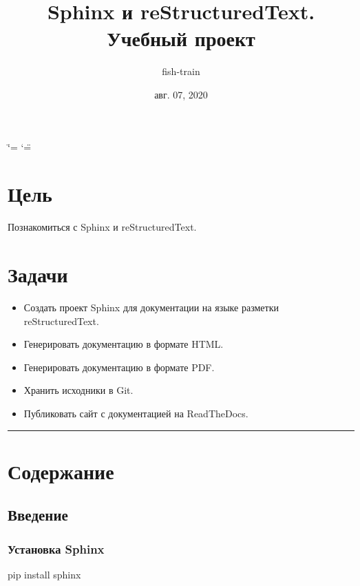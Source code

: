 \documentclass[letterpaper,12pt,russian]{sphinxmanual}
\title{Sphinx и reStructuredText. Учебный проект}
\date{авг. 07, 2020}
\author{fish-train}
\begin{document}
\ifdefined\shorthandoff
  \ifnum\catcode`\=\string=\active\shorthandoff{=}\fi
  \ifnum\catcode`\"=\active{}\fi
\fi

\pagestyle{empty}
\sphinxmaketitle
\pagestyle{plain}
\sphinxtableofcontents
\pagestyle{normal}
\label{\detokenize{index::doc}}



\chapter{Цель}
\label{\detokenize{index:id1}}
Познакомиться с Sphinx и reStructuredText.


\chapter{Задачи}
\label{\detokenize{index:id2}}\begin{itemize}
\item {} 
Создать проект Sphinx для документации на языке разметки reStructuredText.

\item {} 
Генерировать документацию в формате HTML.

\item {} 
Генерировать документацию в формате PDF.

\item {} 
Хранить исходники в Git.

\item {} 
Публиковать сайт с документацией на ReadTheDocs.

\end{itemize}


\bigskip\hrule\bigskip



\chapter{Содержание}
\label{\detokenize{index:id3}}

\section{Введение}
\label{\detokenize{start:id1}}\label{\detokenize{start::doc}}

\subsection{Установка Sphinx}
\label{\detokenize{start:sphinx}}
\begin{sphinxVerbatim}[commandchars=\\\{\}]
pip install sphinx
\end{sphinxVerbatim}
\end{document}
